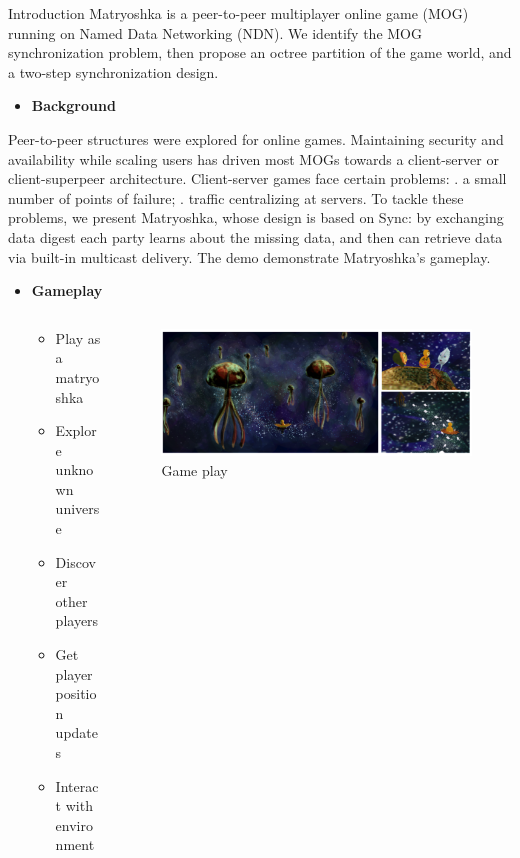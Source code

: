 \documentclass[final,hyperref={pdfpagelabels=false},20pt]{beamer}
\begin{document}
\begin{frame}[t]
\begin{columns}[t]
\begin{column}{.465\textwidth}
\begin{block}{Introduction}
Matryoshka is a peer-to-peer multiplayer online game (MOG) running on Named Data Networking (NDN). \newline
We identify the MOG synchronization problem, then propose an octree partition of the game world, and a two-step synchronization design. 
\newline
\begin{itemize}
\item \textbf{Background} 
\end{itemize}
Peer-to-peer structures were explored for online games. \newline
Maintaining security and availability while scaling users has driven most MOGs towards a client-server or client-superpeer architecture.\newline
Client-server games face certain problems: . a small number of points of failure; . traffic centralizing at servers. \newline
To tackle these problems, we present Matryoshka, whose design is based on Sync: by exchanging data digest each party learns about the missing data, and then can retrieve data via built-in multicast delivery. \newline
The demo demonstrate Matryoshka's gameplay.
\newline
\begin{itemize}
\item \textbf{Gameplay}
\begin{columns}
\begin{column}{.40\textwidth}
\begin{itemize}
\item Play as a matryoshka
\item Explore unknown universe
\item Discover other players
\item Get player position updates
\item Interact with environment
\end{itemize}
\end{column}

\begin{column}{.55\textwidth}
\begin{figure}
\includegraphics[width=0.9\linewidth]{gamestory}
\caption{Game play}
\label{fig:gamestory}
\end{figure}
\end{column}
\end{columns}


\end{itemize}
\end{block}
\end{column}
\end{columns}
\end{frame}
\end{document}
